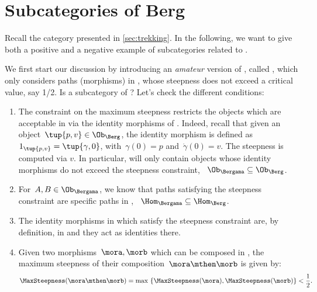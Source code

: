 
\section{Subcategories of Berg}
\label{sec:subcat_berg}

Recall the category \Berg presented in \cref{sec:trekking}.
In the following, we want to give both a positive and a negative example of subcategories related to \Berg.

We first start our discussion by introducing an \emph{amateur} version of \Berg, called \Bergama, which only considers paths (morphisms) in \Berg, whose steepness does not exceed a critical value, say 1/2.
Is \Bergama a subcategory of \Berg?
Let's check the different conditions:
\begin{enumerate}
    \item The constraint on the maximum steepness restricts the objects which are acceptable in \Bergama via the identity morphisms of \Berg.
          Indeed, recall that given an object~$\tup{p,v}\in \Ob_{\Berg}$, the identity morphism is defined as~$1_{\tup{p,v}}=\tup{\gamma,0}$, with~$\gamma(0)=p$ and~$\dot{\gamma}(0)=v$.
          The steepness is computed via $v$.
          In particular, \Bergama will only contain objects whose identity morphisms do not exceed the steepness constraint, \ie ~$\Ob_\Bergama \subseteq \Ob_\Berg$.
    \item For~$A,B\in \Ob_{\Bergama}$, we know that paths satisfying the steepness constraint are specific paths in \Berg, \ie ~$\Hom_{\Bergama}\subseteq \Hom_{\Berg}$.
    \item The identity morphisms in \Berg which satisfy the steepness constraint are, by definition, in \Bergama and they act as identities there.
    \item Given two morphisms~$\mora,\morb$ which can be composed in \Bergama, the maximum steepness of their composition~$\mora \mthen \morb$ is given by:
          \begin{equation*}
              \MaxSteepness(\mora \mthen \morb)
              =
              \max \ \{
              \MaxSteepness(\mora),
              \MaxSteepness(\morb)
              \}
              <
              \frac{1}{2}.
          \end{equation*}
\end{enumerate}

